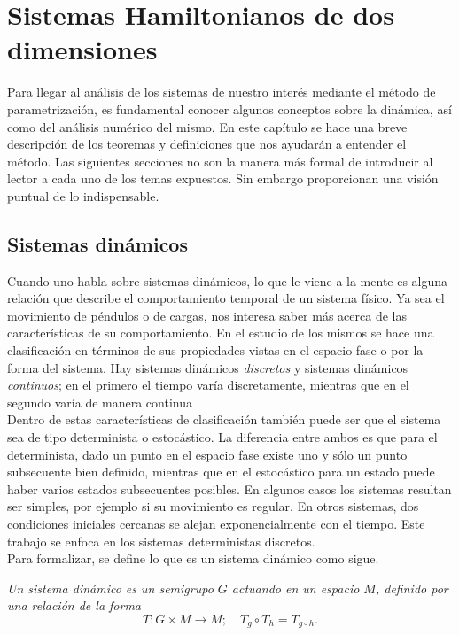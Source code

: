 \chapter{Sistemas Hamiltonianos de dos dimensiones}
Para llegar al análisis de los sistemas de nuestro interés mediante el método de parametrización, es fundamental conocer algunos conceptos sobre la dinámica, así como del análisis numérico del mismo. En este capítulo se hace una breve descripción de los teoremas y definiciones que nos ayudarán a entender el método. Las siguientes secciones no son la manera más formal de introducir al lector a cada uno de los temas expuestos. Sin embargo proporcionan una visión puntual de lo indispensable. 

\section{Sistemas dinámicos}
Cuando uno habla sobre sistemas dinámicos, lo que le viene a la mente es alguna relación que describe el comportamiento temporal de un sistema físico. Ya sea el movimiento de péndulos o de cargas, nos interesa saber más acerca de las características de su comportamiento. 
En el estudio de los mismos se hace una clasificación en términos de sus propiedades vistas en el espacio fase o por la forma del sistema. Hay sistemas dinámicos \textit{discretos} y sistemas dinámicos \textit{continuos}; en el primero el tiempo varía discretamente, mientras que en el segundo varía de manera continua \\

 Dentro de estas características de clasificación también puede ser que el sistema sea de tipo determinista o estocástico. La diferencia entre ambos es que para el determinista, dado un punto en el espacio fase existe uno y sólo un punto subsecuente bien definido, mientras que en el estocástico para un estado puede haber varios estados subsecuentes posibles.
En algunos casos los sistemas resultan ser simples, por ejemplo si su mo\-vi\-mien\-to es regular. En otros sistemas, dos condiciones iniciales cercanas se alejan ex\-po\-nen\-cial\-men\-te con el tiempo. Este trabajo se enfoca en los  sistemas deterministas discretos.\\

Para formalizar, se define lo que es un sistema dinámico como sigue.  \\
\begin{defini}
\textit{Un sistema dinámico es un semigrupo $G$ actuando en un espacio $M$, definido por una relación de la forma}
\begin{equation}
T : G \times M \rightarrow M; \quad
T_{g}\circ T_{h}=T_{g\circ h} . \label{def sistema dinamico}
\end{equation}
\end{defini}


